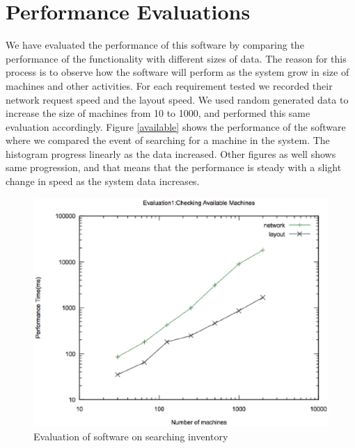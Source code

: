 \section{Performance Evaluations}
We have evaluated the performance of this software by comparing the performance of the functionality with different sizes of data. The reason for this process is to observe how the software will perform as the system grow in size of machines and other activities. For each requirement tested we recorded their network request speed and the  layout speed. We used random generated data to increase the size of machines from 10 to 1000, and performed this same evaluation accordingly. Figure \autoref{available} shows the performance of the software where we compared the event of searching for a machine in the system. The histogram progress linearly as the data increased. Other figures as well shows same progression, and that means that the performance is steady with a slight change in speed as the system data increases.
\begin{figure}[h]
 \includegraphics[width=\linewidth]{available.eps}
  \caption{Evaluation of software on searching inventory}
  \label{available}
\end{figure}

